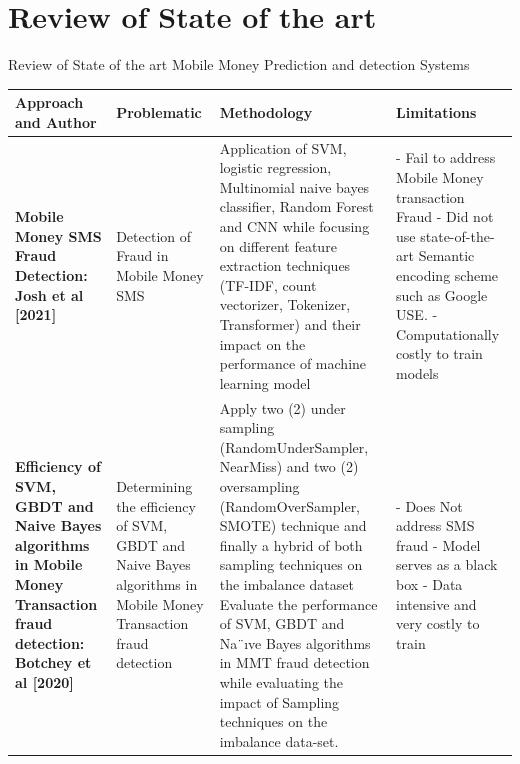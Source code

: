 \documentclass[11pt,aspectratio=169]{beamer}
\begin{document}
		
	\section{Review of State of the art}
	\begin{frame}{Review of State of the art Mobile Money Prediction and detection Systems}
		\begin{table}
			\begin{center}
				{\tiny
					\begin{tabular}{ | m{2.5 cm} | m{2.5 cm} | m{4 cm} | m{4 cm} |}  
						\hline
						\rowcolor{orange}
						Approach and Author & Problematic & Methodology & Limitations  \\
						\hline
						
						\textbf{Mobile Money SMS Fraud Detection: Josh et al [2021]}
						& Detection of Fraud in Mobile Money SMS
						& Application of SVM, logistic regression, Multinomial naive bayes
						classifier, Random Forest and CNN while focusing on different feature extraction
						techniques (TF-IDF, count vectorizer, Tokenizer, Transformer) and their impact on the
						performance of machine learning model
						& 
						- Fail to address Mobile Money transaction Fraud \newline
						- Did not use state-of-the-art Semantic encoding scheme such as Google USE. \newline
						- Computationally costly to train models\newline \\
						\hline
						
						\textbf{Efficiency of SVM, GBDT and Naive Bayes algorithms in Mobile Money Transaction fraud detection: Botchey et al [2020]}
						& 
						Determining the efficiency of SVM, GBDT and Naive Bayes algorithms in Mobile Money Transaction fraud detection
						& 
						Apply two (2) under sampling (RandomUnderSampler, NearMiss)
						and two (2) oversampling (RandomOverSampler, SMOTE) technique and finally a
						hybrid of both sampling techniques on the imbalance dataset Evaluate the performance
						of SVM, GBDT and Na¨ıve Bayes algorithms in MMT fraud detection while evaluating
						the impact of Sampling techniques on the imbalance data-set.
						& 
						- Does Not address SMS fraud \newline
					 	-  Model serves as a black box \newline
						- Data intensive and very costly to train \\
						\hline
						

\end{tabular}}
\end{center}
\end{table}
\end{frame}
\end{document}
